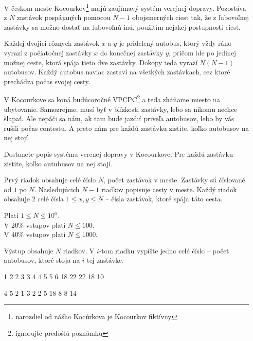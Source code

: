 





V českom meste Kocourkov\footnote{narozdiel od nášho Kocúrkova je Kocourkov fiktívny}
majú zaujímavý systém verejnej dopravy.
Pozostáva z $N$ zastávok pospájaných pomocou $N-1$ obojsmerných ciest tak,
že z ľubovoľnej zastávky sa možno dostať na ľubovoľnú inú,
použitím nejakej postupnosti ciest.

Každej dvojici rôznych zastávok $x$ a $y$ je pridelený autobus, ktorý vždy ráno vyrazí z počiatočnej
zastávky $x$ do konečnej zastávky $y$, pričom ide po jedinej možnej ceste, ktorá spája tieto dve
zastávky. Dokopy teda vyrazí $N(N-1)$ autobusov. Každý autobus naviac zastaví na všetkých
zastávkach, cez ktoré prechádza počas svojej cesty.

V Kocourkove sa koná budúcoročné VPCPC\footnote{ignorujte predošlú poznámku}
a teda zháňame miesto na ubytovanie.
Samozrejme, musí byť v blízkosti zastávky, lebo sa nikomu nechce šlapať.
Ale nepáči sa nám, ak tam bude jazdiť priveľa autobusov, lebo by vás rušili počas contestu.
A preto nám pre každú zastávku zistite, koľko autobusov na nej stojí.


Dostanete popis systému verenej dopravy v Kocourkove.
Pre každú zastávku zistite, koľko autubusov na nej stojí.


Prvý riadok obsahuje celé číslo $N$,
počet zastávok v meste.
Zastávky sú číslované od $1$ po $N$.
Nasledujúcich $N-1$ riadkov popisuje cesty v meste.
Každý riadok obsahuje $2$ celé čísla $1 \le x, y \le N$
-- čísla zastávok, ktoré spája táto cesta.

\bigskip
\noindent
Platí $1 \leq N \leq 10^6$.\\
V $20\%$ vstupov platí $N \leq 100$.\\
V $40\%$ vstupov platí $N \leq 1000$.


Výstup obsahuje $N$ riadkov.
V $i$-tom riadku vypíšte jedno celé číslo --
počet autobusov, ktoré stoja na $i$-tej zastávke.


1 2
2 3
3 4
4 5
5 6
18
22
22
18
10
\sampleEND

\bigskip

4 5
2 1
3 2
2 5
18
8
8
14
\sampleEND


